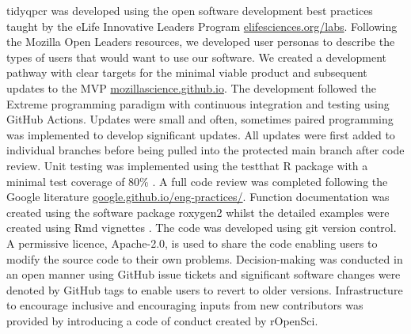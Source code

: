 \documentclass[../main.tex]{subfiles}
\begin{document}
tidyqpcr was developed using the open software development best practices taught by the eLife Innovative Leaders Program \href{https://elifesciences.org/labs/bced51c5/innovation-leaders-2020-a-summary}{elifesciences.org/labs}.
Following the Mozilla Open Leaders resources, we developed user personas to describe the types of users that would want to use our software.
We created a development pathway with clear targets for the minimal viable product and subsequent updates to the MVP \href{http://mozillascience.github.io/working-open-workshop/personas_pathways/}{mozillascience.github.io}.
The development followed the Extreme programming paradigm with continuous integration and testing using GitHub Actions.
Updates were small and often, sometimes paired programming was implemented to develop significant updates.
All updates were first added to individual branches before being pulled into the protected main branch after code review.
Unit testing was implemented using the testthat R package with a minimal test coverage of 80\% \parencite{Wickham2011}.
A full code review was completed following the Google literature  \href{https://google.github.io/eng-practices/review/}{google.github.io/eng-practices/}.
Function documentation was created using the software package roxygen2 whilst the detailed examples were created using Rmd vignettes \parencite{Wickham2022, Wickham2021}.
The code was developed using git version control.
A permissive licence, Apache-2.0, is used to share the code enabling users to modify the source code to their own problems.
Decision-making was conducted in an open manner using GitHub issue tickets and significant software changes were denoted by GitHub tags to enable users to revert to older versions.
Infrastructure to encourage inclusive and encouraging inputs from new contributors was provided by introducing a code of conduct created by rOpenSci.
\end{document}
